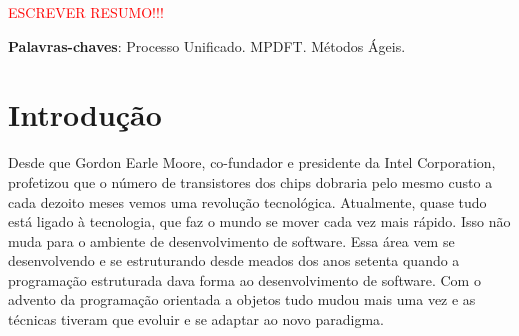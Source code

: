 \documentclass[
	article,			%
	11pt,				%
	oneside,			%
	a4paper,			%
	english,			%
	brazil,				%
	sumario=tradicional
	]{abntex2}
\begin{document}
\frenchspacing 


%
%
\maketitle

\begin{resumoumacoluna}

   \textcolor{red}{ESCREVER RESUMO!!!}

   \vspace{\onelineskip}

   \noindent
   \textbf{Palavras-chaves}: Processo Unificado. MPDFT. Métodos Ágeis.
\end{resumoumacoluna}


\textual

\section*{Introdução}

Desde que Gordon Earle Moore, co-fundador e presidente da Intel Corporation,
profetizou que o número de transistores dos chips dobraria pelo mesmo custo a
cada dezoito meses vemos uma revolução tecnológica. Atualmente, quase tudo está
ligado à tecnologia, que faz o mundo se mover cada vez mais rápido. Isso não
muda para o ambiente de desenvolvimento de software. Essa área vem se
desenvolvendo e se estruturando desde meados dos anos setenta quando a
programação estruturada dava forma ao desenvolvimento de software. Com o advento
da programação orientada a objetos tudo mudou mais uma vez e as técnicas tiveram
que evoluir e se adaptar ao novo paradigma.
\end{document}
